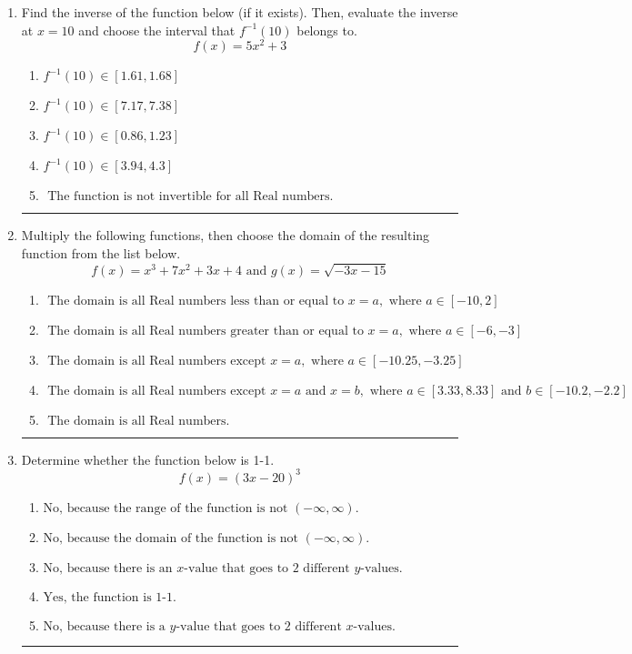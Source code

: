 \documentclass[14pt]{extbook}
\newcommand{\litem}[1]{\item#1\hspace*{-1cm}\rule{\textwidth}{0.4pt}}
\begin{document}
\begin{enumerate}
{\begin{enumerate}[label=\Alph*.]
\end{enumerate} }
\litem{
Find the inverse of the function below (if it exists). Then, evaluate the inverse at $x = 10$ and choose the interval that $f^{-1}(10)$ belongs to.\[ f(x) = 5 x^2 + 3 \]\begin{enumerate}[label=\Alph*.]
\item \( f^{-1}(10) \in [1.61, 1.68] \)
\item \( f^{-1}(10) \in [7.17, 7.38] \)
\item \( f^{-1}(10) \in [0.86, 1.23] \)
\item \( f^{-1}(10) \in [3.94, 4.3] \)
\item \( \text{ The function is not invertible for all Real numbers. } \)

\end{enumerate} }
\litem{
Multiply the following functions, then choose the domain of the resulting function from the list below.\[ f(x) = x^{3} +7 x^{2} +3 x + 4 \text{ and } g(x) = \sqrt{-3x-15}  \]\begin{enumerate}[label=\Alph*.]
\item \( \text{ The domain is all Real numbers less than or equal to } x = a, \text{ where } a \in [-10, 2] \)
\item \( \text{ The domain is all Real numbers greater than or equal to } x = a, \text{ where } a \in [-6, -3] \)
\item \( \text{ The domain is all Real numbers except } x = a, \text{ where } a \in [-10.25, -3.25] \)
\item \( \text{ The domain is all Real numbers except } x = a \text{ and } x = b, \text{ where } a \in [3.33, 8.33] \text{ and } b \in [-10.2, -2.2] \)
\item \( \text{ The domain is all Real numbers. } \)

\end{enumerate} }
\litem{
Determine whether the function below is 1-1.\[ f(x) = (3 x - 20)^3 \]\begin{enumerate}[label=\Alph*.]
\item \( \text{No, because the range of the function is not $(-\infty, \infty)$.} \)
\item \( \text{No, because the domain of the function is not $(-\infty, \infty)$.} \)
\item \( \text{No, because there is an $x$-value that goes to 2 different $y$-values.} \)
\item \( \text{Yes, the function is 1-1.} \)
\item \( \text{No, because there is a $y$-value that goes to 2 different $x$-values.} \)


\end{enumerate}}
\end{enumerate}
\end{document}
